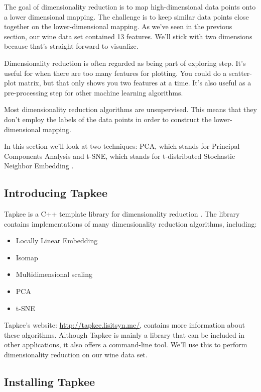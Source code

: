 \documentclass[
]{book}
\providecommand{\tightlist}{%
  \setlength{\itemsep}{0pt}\setlength{\parskip}{0pt}}
\theoremstyle{definition}
\theoremstyle{definition}
\theoremstyle{definition}
\theoremstyle{remark}
\begin{document}
The goal of dimensionality reduction is to map high-dimensional data points onto a lower dimensional mapping. The challenge is to keep similar data points close together on the lower-dimensional mapping. As we've seen in the previous section, our wine data set contained 13 features. We'll stick with two dimensions because that's straight forward to visualize.

Dimensionality reduction is often regarded as being part of exploring step. It's useful for when there are too many features for plotting. You could do a scatter-plot matrix, but that only shows you two features at a time. It's also useful as a pre-processing step for other machine learning algorithms.

Most dimensionality reduction algorithms are unsupervised. This means that they don't employ the labels of the data points in order to construct the lower-dimensional mapping.

In this section we'll look at two techniques: PCA, which stands for Principal Components Analysis \citep{Pearson1901} and t-SNE, which stands for t-distributed Stochastic Neighbor Embedding \citep{van2008visualizing}.

\hypertarget{introducing-tapkee}{%
\subsection{Introducing Tapkee}\label{introducing-tapkee}}

Tapkee is a C++ template library for dimensionality reduction \citep{Lisitsyn2013}. The library contains implementations of many dimensionality reduction algorithms, including:

\begin{itemize}
\tightlist
\item
  Locally Linear Embedding
\item
  Isomap
\item
  Multidimensional scaling
\item
  PCA
\item
  t-SNE
\end{itemize}

Tapkee's website: \url{http://tapkee.lisitsyn.me/}, contains more information about these algorithms. Although Tapkee is mainly a library that can be included in other applications, it also offers a command-line tool. We'll use this to perform dimensionality reduction on our wine data set.

\hypertarget{installing-tapkee}{%
\subsection{Installing Tapkee}\label{installing-tapkee}}
\end{document}
